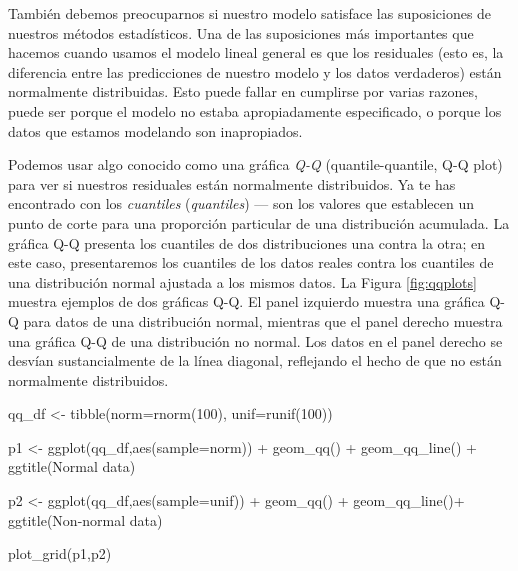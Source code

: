 \documentclass[
  12pt,
]{book}
\newenvironment{Shaded}{\begin{snugshade}}{\end{snugshade}}
\newcommand{\AttributeTok}[1]{\textcolor[rgb]{0.77,0.63,0.00}{#1}}
\newcommand{\DecValTok}[1]{\textcolor[rgb]{0.00,0.00,0.81}{#1}}
\newcommand{\FunctionTok}[1]{\textcolor[rgb]{0.00,0.00,0.00}{#1}}
\newcommand{\NormalTok}[1]{#1}
\newcommand{\OtherTok}[1]{\textcolor[rgb]{0.56,0.35,0.01}{#1}}
\newcommand{\SpecialCharTok}[1]{\textcolor[rgb]{0.00,0.00,0.00}{#1}}
\newcommand{\StringTok}[1]{\textcolor[rgb]{0.31,0.60,0.02}{#1}}
\theoremstyle{definition}
\theoremstyle{definition}
\theoremstyle{definition}
\theoremstyle{remark}
\begin{document}
También debemos preocuparnos si nuestro modelo satisface las suposiciones de nuestros métodos estadísticos. Una de las suposiciones más importantes que hacemos cuando usamos el modelo lineal general es que los residuales (esto es, la diferencia entre las predicciones de nuestro modelo y los datos verdaderos) están normalmente distribuidas. Esto puede fallar en cumplirse por varias razones, puede ser porque el modelo no estaba apropiadamente especificado, o porque los datos que estamos modelando son inapropiados.

Podemos usar algo conocido como una gráfica \emph{Q-Q} (quantile-quantile, Q-Q plot) para ver si nuestros residuales están normalmente distribuidos. Ya te has encontrado con los \emph{cuantiles} (\emph{quantiles}) --- son los valores que establecen un punto de corte para una proporción particular de una distribución acumulada. La gráfica Q-Q presenta los cuantiles de dos distribuciones una contra la otra; en este caso, presentaremos los cuantiles de los datos reales contra los cuantiles de una distribución normal ajustada a los mismos datos. La Figura \ref{fig:qqplots} muestra ejemplos de dos gráficas Q-Q. El panel izquierdo muestra una gráfica Q-Q para datos de una distribución normal, mientras que el panel derecho muestra una gráfica Q-Q de una distribución no normal. Los datos en el panel derecho se desvían sustancialmente de la línea diagonal, reflejando el hecho de que no están normalmente distribuidos.

\begin{Shaded}
\begin{Highlighting}[]
\NormalTok{qq\_df }\OtherTok{\textless{}{-}} \FunctionTok{tibble}\NormalTok{(}\AttributeTok{norm=}\FunctionTok{rnorm}\NormalTok{(}\DecValTok{100}\NormalTok{),}
                \AttributeTok{unif=}\FunctionTok{runif}\NormalTok{(}\DecValTok{100}\NormalTok{))}

\NormalTok{p1 }\OtherTok{\textless{}{-}} \FunctionTok{ggplot}\NormalTok{(qq\_df,}\FunctionTok{aes}\NormalTok{(}\AttributeTok{sample=}\NormalTok{norm)) }\SpecialCharTok{+} 
  \FunctionTok{geom\_qq}\NormalTok{() }\SpecialCharTok{+} 
  \FunctionTok{geom\_qq\_line}\NormalTok{() }\SpecialCharTok{+} 
  \FunctionTok{ggtitle}\NormalTok{(}\StringTok{\textquotesingle{}Normal data\textquotesingle{}}\NormalTok{)}

\NormalTok{p2 }\OtherTok{\textless{}{-}} \FunctionTok{ggplot}\NormalTok{(qq\_df,}\FunctionTok{aes}\NormalTok{(}\AttributeTok{sample=}\NormalTok{unif)) }\SpecialCharTok{+} 
  \FunctionTok{geom\_qq}\NormalTok{() }\SpecialCharTok{+} 
  \FunctionTok{geom\_qq\_line}\NormalTok{()}\SpecialCharTok{+} 
  \FunctionTok{ggtitle}\NormalTok{(}\StringTok{\textquotesingle{}Non{-}normal data\textquotesingle{}}\NormalTok{)}

\FunctionTok{plot\_grid}\NormalTok{(p1,p2)}
\end{Highlighting}
\end{Shaded}
\end{document}
